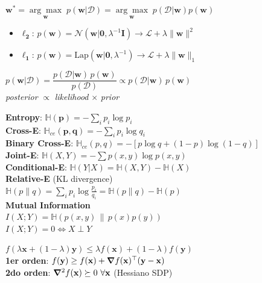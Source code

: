 \documentclass[11pt, a4paper]{article}
\newcommand{\w}{\mathbf{w}}
\newcommand{\x}{\mathbf{x}}
\newcommand{\y}{\mathbf{y}}
\newcommand{\Loss}{\mathcal{L}}
\begin{document}
\begin{minipage}[t]{0.325\textwidth}
\begin{tcolorbox}[formulabox=Maximum A Posteriori (MAP), colframe=softTeal]
        $\w^* = \underset{\w}{\arg\max}\; p(\w|\mathcal{D}) = \underset{\w}{\arg\max}\; p(\mathcal{D}|\w) p(\w)$ \\
        \begin{itemize}
            \item $\boldsymbol{\ell_2}$: $p(\w)=\mathcal{N}(\w|\mathbf{0},\lambda^{-1}\mathbf{I}) \to \Loss + \lambda\|\w\|^2$ 
            \item $\boldsymbol{\ell_1}$: $p(\w)=\text{Lap}(\w|\mathbf{0},\lambda^{-1}) \to\Loss + \lambda\|\w\|_1$
        \end{itemize}
        
    \end{tcolorbox}
    \begin{tcolorbox}[formulabox=Bayes, colframe=softTeal]
        \centering
        $p(\w|\mathcal{D}) = \dfrac{p(\mathcal{D}|\w)\,p(\w)}{p(\mathcal{D})}
        \propto p(\mathcal{D}|\w)\,p(\w)$\\[2pt]
        \textit{posterior} $\propto$ \textit{likelihood} $\times$ \textit{prior}
    \end{tcolorbox}
    \begin{tcolorbox}[formulabox=Information Theory, colframe=softTeal]
        \textbf{Entropy}: $\mathbb{H}(\mathbf{p}) = -\sum_i p_i \log p_i$\\[2pt]
        \textbf{Cross-E}: $\mathbb{H}_{ce}(\mathbf{p},\mathbf{q}) = -\sum_i p_i \log q_i$ \\
        \textbf{Binary Cross-E}:
        $\mathbb{H}_{ce}(p,q) = -[p \log q + (1-p)\log (1-q)]$\\[2pt]
        \textbf{Joint-E}: $\mathbb{H}(X,Y)=-\sum p(x,y)\log p(x,y)$ \\
        \textbf{Conditional-E}: $\mathbb{H}(Y|X)= \mathbb{H}(X,Y)-\mathbb{H}(X)$ \\
        \textbf{Relative-E} (KL divergence)\\
        $\mathbb{H}(p\|q)=\sum_i p_i\log\tfrac{p_i}{q_i}=\mathbb{H}(p\|q) - \mathbb{H}(p)$\\
        \textbf{Mutual Information}\\
        $I(X;Y)=\mathbb{H}(p(x,y)\, \| \, p(x)p(y))$\\
        $I(X;Y)=0 \Leftrightarrow X \perp Y$\\[2pt]
    \end{tcolorbox}
    \begin{tcolorbox}[formulabox=Convexity, colframe=softOrange]
         $f(\lambda\x+(1-\lambda)\y)\leq\lambda f(\x)+(1-\lambda)f(\y)$\\
        \textbf{1er orden}: $f(\y)\geq f(\x)+\grad f(\x)^\top(\y-\x)$\\
        \textbf{2do orden}: $\grad^2 f(\x)\succeq 0\ \forall\x$ (Hessiano SDP)\\
    \end{tcolorbox}
\end{minipage}
\end{document}
